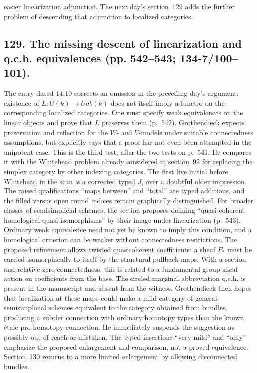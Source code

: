 \documentclass[10pt,oneside]{book}
\begin{document}
easier linearization adjunction. The next day's section~129 adds the further problem of descending that adjunction to localized categories.

\subsection*{129. The missing descent of linearization and q.c.h. equivalences (pp. 542--543; 134-7/100--101).}
The entry dated 14.10 corrects an omission in the preceding day's argument: existence of $L:U(k)\to Uab(k)$ does not itself imply a functor on the corresponding localized categories. One must specify weak equivalences on the linear objects and prove that $L$ preserves them (p.~542). Grothendieck expects preservation and reflection for the $W$- and $V$-models under suitable connectedness assumptions, but explicitly says that a proof has not even been attempted in the unipotent case. This is the third test, after the two tests on p.~541. He compares it with the Whitehead problem already considered in section~92 for replacing the simplex category by other indexing categories. The first live initial before Whitehead in the scan is a corrected typed $J$, over a doubtful older impression. The raised qualifications ``maps between'' and ``total'' are typed additions, and the filled versus open round indices remain graphically distinguished. For broader classes of semisimplicial schemes, the section proposes defining ``quasi-coherent homological quasi-isomorphisms'' by their image under linearization (p.~543). Ordinary weak equivalence need not yet be known to imply this condition, and a homological criterion can be weaker without connectedness restrictions. The proposed refinement allows twisted quasicoherent coefficients: a sheaf $F_*$ must be carried isomorphically to itself by the structural pullback maps. With a section and relative zero-connectedness, this is related to a fundamental-group-sheaf action on coefficients from the base. The circled marginal abbreviation q.c.h. is present in the manuscript and absent from the witness. Grothendieck then hopes that localization at these maps could make a mild category of general semisimplicial schemes equivalent to the category obtained from bundles, producing a subtler connection with ordinary homotopy types than the known étale pro-homotopy connection. He immediately suspends the suggestion as possibly out of reach or mistaken. The typed insertions ``very mild'' and ``only'' emphasize the proposed enlargement and comparison, not a proved equivalence. Section~130 returns to a more limited enlargement by allowing disconnected bundles.
\end{document}
